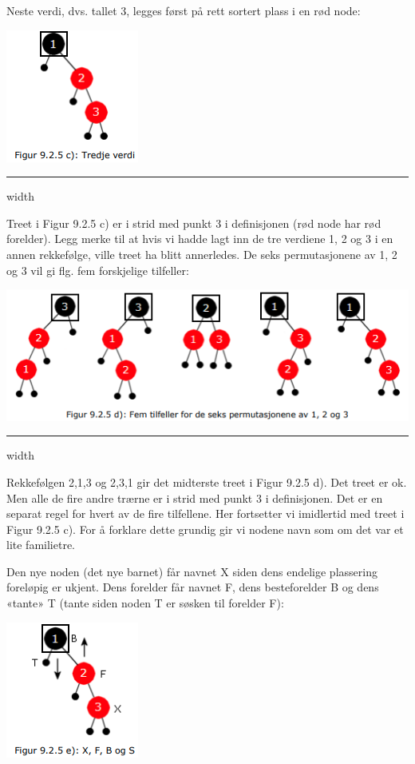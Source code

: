 \documentclass[11pt]{article}
\begin{document}
        \begin{multicols}{2}
            Neste verdi, dvs. tallet 3, legges først på rett sortert plass i en rød node:

            \columnbreak
            \includegraphics[center]{f-9.2.5c.png}
        \end{multicols}

        \hrule width \textwidth

        Treet i Figur 9.2.5 c) er i strid med punkt 3 i definisjonen (rød node har rød forelder). Legg
        merke til at hvis vi hadde lagt inn de tre verdiene 1, 2 og 3 i en annen rekkefølge, ville treet
        ha blitt annerledes. De seks permutasjonene av 1, 2 og 3 vil gi flg. fem forskjelige tilfeller:

        \includegraphics[center]{f-9.2.5d.png}

        \hrule width \textwidth

        Rekkefølgen 2,1,3 og 2,3,1 gir det midterste treet i Figur 9.2.5 d). Det treet er ok. Men alle
        de fire andre trærne er i strid med punkt 3 i definisjonen. Det er en separat regel for hvert av
        de fire tilfellene. Her fortsetter vi imidlertid med treet i Figur 9.2.5 c). For å forklare dette
        grundig gir vi nodene navn som om det var et lite familietre.

        \begin{multicols}{2}
            Den nye noden (det nye barnet)
            får navnet X siden dens endelige plassering foreløpig er ukjent. Dens forelder får navnet F,
            dens besteforelder B og dens «tante» T (tante siden noden T er søsken til forelder F):

            \columnbreak
            \includegraphics[center]{f-9.2.5e.png}
        \end{multicols}
\end{document}
